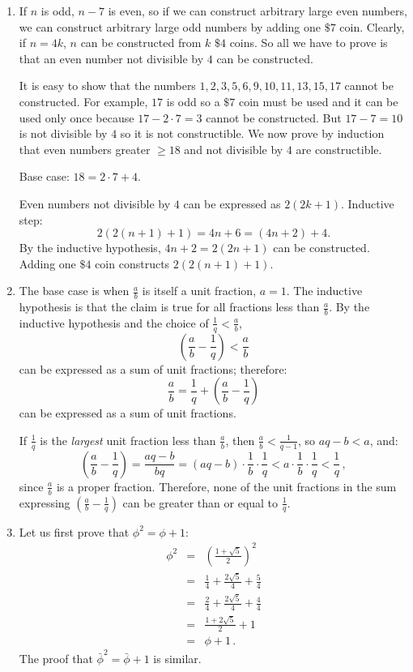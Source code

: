 \documentclass[11pt,a4paper]{report}
\begin{document}
\begin{enumerate}

\item If $n$ is odd, $n-7$ is even, so if we can construct arbitrary large even numbers, we can construct arbitrary large odd numbers by adding one $\$7$ coin. Clearly, if $n=4k$, $n$ can be constructed from $k$ $\$4$ coins. So all we have to prove is that an even number not divisible by $4$ can be constructed.

It is easy to show that the numbers $1,2,3,5,6,9,10,11,13,15,17$ cannot be constructed. For example, $17$ is odd so a $\$7$ coin must be used and it can be used only once because $17-2\cdot 7=3$ cannot be constructed. But $17-7=10$ is not divisible by $4$ so it is not constructible. We now prove by induction that even numbers greater $\geq 18$ and not divisible by $4$ are constructible.

Base case: $18=2\cdot 7 + 4$.

Even numbers not divisible by $4$ can be expressed as $2(2k+1)$. Inductive step:
\[
2(2(n+1)+1) = 4n+6 = (4n+2)+4.
\]
By the inductive hypothesis, $4n+2=2(2n+1)$ can be constructed. Adding one $\$4$ coin constructs $2(2(n+1)+1)$.

\item The base case is when $\frac{a}{b}$ is itself a unit fraction, $a=1$. The inductive hypothesis is that the claim is true for all fractions less than $\frac{a}{b}$. By the inductive hypothesis and the choice of $\frac{1}{q} < \frac{a}{b}$,
\[
\left( \frac{a}{b} - \frac{1}{q} \right) < \frac{a}{b}
\]
can be expressed as a sum of unit fractions; therefore:
\[
\frac{a}{b} = \frac{1}{q} + \left( \frac{a}{b} - \frac{1}{q} \right)
\]
can be expressed as a sum of unit fractions.

If $\frac{1}{q}$ is the \emph{largest} unit fraction less than $\frac{a}{b}$, then $\frac{a}{b} < \frac{1}{q-1}$, so $aq-b < a$, and:
\[\left( \frac{a}{b} - \frac{1}{q} \right) = \frac{aq-b}{bq} = (aq-b)\cdot \frac{1}{b}\cdot\frac{1}{q} < a\cdot\frac{1}{b}\cdot\frac{1}{q}<\frac{1}{q}\,,
\]
since $\frac{a}{b}$ is a proper fraction. Therefore, none of the unit fractions in the sum expressing $\left( \frac{a}{b} - \frac{1}{q} \right)$ can be greater than or equal to $\frac{1}{q}$.

\item Let us first prove that $\phi^2=\phi+1$:
\vspace*{-8pt}
\begin{eqnarray*}
\phi^2 &=& \left(\frac{1+\sqrt{5}}{2}\right)^2\\
&=& \frac{1}{4} + \frac{2\sqrt{5}}{4} + \frac{5}{4}\\
&=& \frac{2}{4} + \frac{2\sqrt{5}}{4} + \frac{4}{4}\\
&=& \frac{1+2\sqrt{5}}{2} + 1\\
&=&\phi + 1\,.
\end{eqnarray*}
The proof that $\bar{\phi}^2=\bar{\phi}+1$ is similar.


\end{enumerate}
\end{document}
